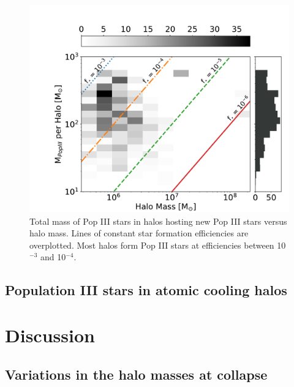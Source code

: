 \documentclass[a4paper,fleqn,usenatbib]{mnras}
\begin{document}
\begin{figure}
	\includegraphics[width=\columnwidth]{images/totp3mass_halomass_sidehist.pdf}
    \caption{Total mass of Pop III stars in halos hosting new Pop III stars versus halo mass. Lines of constant star formation efficiencies are overplotted. Most halos form Pop III stars at efficiencies between 10$^{-3}$ and 10$^{-4}$.}
    \label{fig:totp3mass_halomass_sidehist}
\end{figure}


\subsection{Population III stars in atomic cooling halos}

\section{Discussion}

\subsection{Variations in the halo masses at collapse}
\end{document}
